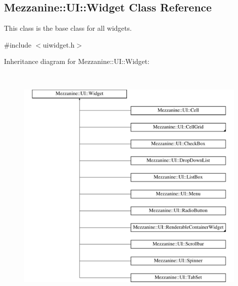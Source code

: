 \hypertarget{classMezzanine_1_1UI_1_1Widget}{
\subsection{Mezzanine::UI::Widget Class Reference}
\label{classMezzanine_1_1UI_1_1Widget}
}


This class is the base class for all widgets.  




{\ttfamily \#include $<$uiwidget.h$>$}

Inheritance diagram for Mezzanine::UI::Widget:\begin{figure}[H]
\begin{center}
\leavevmode
\includegraphics[height=12.000000cm]{classMezzanine_1_1UI_1_1Widget}
\end{center}
\end{figure}
